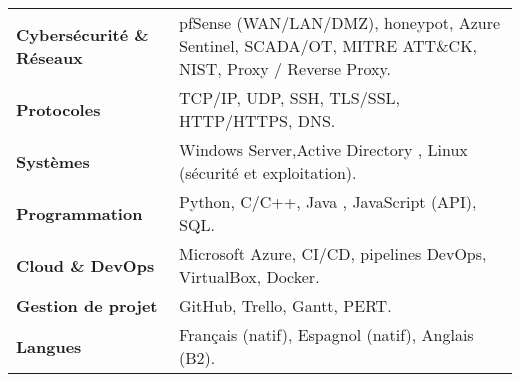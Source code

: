 \documentclass[a4paper,10pt]{article}
\begin{document}
\begin{tabular}{p{4.5cm} p{15cm}}
\textbf{Cybersécurité \& Réseaux} & pfSense (WAN/LAN/DMZ), honeypot, Azure Sentinel, SCADA/OT, MITRE ATT\&CK, NIST, Proxy / Reverse Proxy. \\
\textbf{Protocoles} & TCP/IP, UDP, SSH, TLS/SSL, HTTP/HTTPS, DNS. \\
\textbf{Systèmes} & Windows Server,Active Directory , Linux (sécurité et exploitation). \\
\textbf{Programmation} & Python, C/C++, Java , JavaScript (API), SQL. \\

\textbf{Cloud \& DevOps} & Microsoft Azure, CI/CD, pipelines DevOps, VirtualBox, Docker. \\

\textbf{Gestion de projet} & GitHub, Trello, Gantt, PERT. \\
\textbf{Langues} & Français (natif), Espagnol (natif), Anglais (B2). \\
\end{tabular}
\end{document}
